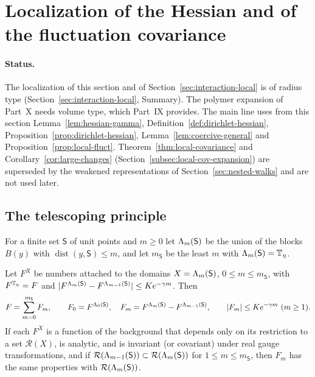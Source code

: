 \section{Localization of the Hessian and of the fluctuation covariance}\label{sec:localization}

\paragraph{Status.} The localization of this section and of Section~\ref{sec:interaction-local} is of radius type (Section~\ref{sec:interaction-local}, Summary). The polymer expansion of Part~X needs volume type, which Part~IX provides. The main line uses from this section Lemma~\ref{lem:hessian-gamma}, Definition~\ref{def:dirichlet-hessian}, Proposition~\ref{prop:dirichlet-hessian}, Lemma~\ref{lem:coercive-general} and Proposition~\ref{prop:local-fluct}. Theorem~\ref{thm:local-covariance} and Corollary~\ref{cor:large-changes} (Section~\ref{subsec:local-cov-expansion}) are superseded by the weakened representations of Section~\ref{sec:nested-walks} and are not used later.

\subsection{The telescoping principle}

For a finite set $\mathsf S$ of unit points and $m\ge0$ let $\Lambda_m(\mathsf S)$ be the union of the blocks $B(y)$ with $\operatorname{dist}(y,\mathsf S)\le m$, and let $m_{\mathsf S}$ be the least $m$ with $\Lambda_m(\mathsf S)=\mathbb T_\eta$.

\begin{lemma}[Telescoping]\label{lem:telescoping}
Let $F^X$ be numbers attached to the domains $X=\Lambda_m(\mathsf S)$, $0\le m\le m_{\mathsf S}$, with $F^{\mathbb T_\eta}=F$ and $|F^{\Lambda_m(\mathsf S)}-F^{\Lambda_{m-1}(\mathsf S)}|\le Ke^{-\gamma m}$. Then
\[
F=\sum_{m=0}^{m_{\mathsf S}}F_m,\qquad F_0=F^{\Lam_0(\mathsf S)},\quad F_m=F^{\Lam_m(\mathsf S)}-F^{\Lam_{m-1}(\mathsf S)},\qquad|F_m|\le Ke^{-\gamma m}\ (m\ge1).
\]
If each $F^X$ is a function of the background that depends only on its restriction to a set $\mathcal R(X)$, is analytic, and is invariant (or covariant) under real gauge transformations, and if $\mathcal R(\Lambda_{m-1}(\mathsf S))\subset\mathcal R(\Lambda_m(\mathsf S))$ for $1\le m\le m_{\mathsf S}$, then $F_m$ has the same properties with $\mathcal R(\Lambda_m(\mathsf S))$.
\end{lemma}

